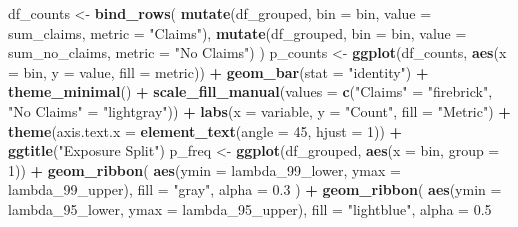 \documentclass[
  english,
  11pt,
]{article}
\newenvironment{Shaded}{\begin{snugshade}}{\end{snugshade}}
\newcommand{\AttributeTok}[1]{\textcolor[rgb]{0.13,0.29,0.53}{#1}}
\newcommand{\DecValTok}[1]{\textcolor[rgb]{0.00,0.00,0.81}{#1}}
\newcommand{\FloatTok}[1]{\textcolor[rgb]{0.00,0.00,0.81}{#1}}
\newcommand{\FunctionTok}[1]{\textcolor[rgb]{0.13,0.29,0.53}{\textbf{#1}}}
\newcommand{\NormalTok}[1]{#1}
\newcommand{\OtherTok}[1]{\textcolor[rgb]{0.56,0.35,0.01}{#1}}
\newcommand{\SpecialCharTok}[1]{\textcolor[rgb]{0.81,0.36,0.00}{\textbf{#1}}}
\newcommand{\StringTok}[1]{\textcolor[rgb]{0.31,0.60,0.02}{#1}}
\begin{document}
\begin{Shaded}
\begin{Highlighting}[]
\NormalTok{    df\_counts }\OtherTok{\textless{}{-}} \FunctionTok{bind\_rows}\NormalTok{(}
        \FunctionTok{mutate}\NormalTok{(df\_grouped, }\AttributeTok{bin =}\NormalTok{ bin, }\AttributeTok{value =}\NormalTok{ sum\_claims, }\AttributeTok{metric =} \StringTok{"Claims"}\NormalTok{),}
        \FunctionTok{mutate}\NormalTok{(df\_grouped, }\AttributeTok{bin =}\NormalTok{ bin, }\AttributeTok{value =}\NormalTok{ sum\_no\_claims, }\AttributeTok{metric =} \StringTok{"No Claims"}\NormalTok{)}
\NormalTok{    )}
\NormalTok{    p\_counts }\OtherTok{\textless{}{-}} \FunctionTok{ggplot}\NormalTok{(df\_counts, }\FunctionTok{aes}\NormalTok{(}\AttributeTok{x =}\NormalTok{ bin, }\AttributeTok{y =}\NormalTok{ value, }\AttributeTok{fill =}\NormalTok{ metric)) }\SpecialCharTok{+}
        \FunctionTok{geom\_bar}\NormalTok{(}\AttributeTok{stat =} \StringTok{"identity"}\NormalTok{) }\SpecialCharTok{+} \FunctionTok{theme\_minimal}\NormalTok{() }\SpecialCharTok{+}
        \FunctionTok{scale\_fill\_manual}\NormalTok{(}\AttributeTok{values =} \FunctionTok{c}\NormalTok{(}\StringTok{"Claims"} \OtherTok{=} \StringTok{"firebrick"}\NormalTok{, }\StringTok{"No Claims"} \OtherTok{=} \StringTok{"lightgray"}\NormalTok{)) }\SpecialCharTok{+}
        \FunctionTok{labs}\NormalTok{(}\AttributeTok{x =}\NormalTok{ variable, }\AttributeTok{y =} \StringTok{"Count"}\NormalTok{, }\AttributeTok{fill =} \StringTok{"Metric"}\NormalTok{) }\SpecialCharTok{+}
        \FunctionTok{theme}\NormalTok{(}\AttributeTok{axis.text.x =} \FunctionTok{element\_text}\NormalTok{(}\AttributeTok{angle =} \DecValTok{45}\NormalTok{, }\AttributeTok{hjust =} \DecValTok{1}\NormalTok{)) }\SpecialCharTok{+}
        \FunctionTok{ggtitle}\NormalTok{(}\StringTok{"Exposure Split"}\NormalTok{)}
\NormalTok{    p\_freq }\OtherTok{\textless{}{-}} \FunctionTok{ggplot}\NormalTok{(df\_grouped, }\FunctionTok{aes}\NormalTok{(}\AttributeTok{x =}\NormalTok{ bin, }\AttributeTok{group =} \DecValTok{1}\NormalTok{)) }\SpecialCharTok{+}
        \FunctionTok{geom\_ribbon}\NormalTok{(}
            \FunctionTok{aes}\NormalTok{(}\AttributeTok{ymin =}\NormalTok{ lambda\_99\_lower, }\AttributeTok{ymax =}\NormalTok{ lambda\_99\_upper),}
            \AttributeTok{fill =} \StringTok{"gray"}\NormalTok{, }\AttributeTok{alpha =} \FloatTok{0.3}
\NormalTok{        ) }\SpecialCharTok{+}
        \FunctionTok{geom\_ribbon}\NormalTok{(}
            \FunctionTok{aes}\NormalTok{(}\AttributeTok{ymin =}\NormalTok{ lambda\_95\_lower, }\AttributeTok{ymax =}\NormalTok{ lambda\_95\_upper),}
            \AttributeTok{fill =} \StringTok{"lightblue"}\NormalTok{, }\AttributeTok{alpha =} \FloatTok{0.5}

\end{Highlighting}
\end{Shaded}
\end{document}
